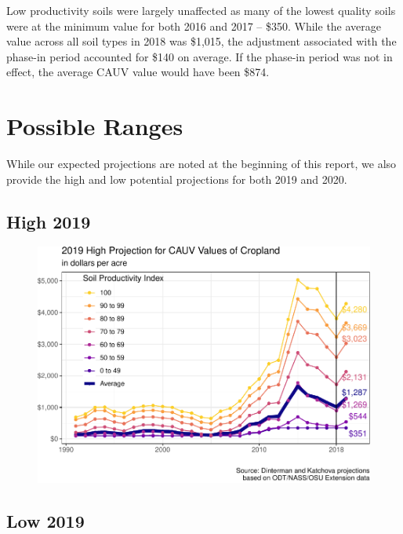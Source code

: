 \documentclass[]{article}
\begin{document}
Low productivity soils were largely unaffected as many of the lowest
quality soils were at the minimum value for both 2016 and 2017 -- \$350.
While the average value across all soil types in 2018 was \$1,015, the
adjustment associated with the phase-in period accounted for \$140 on
average. If the phase-in period was not in effect, the average CAUV
value would have been \$874.

\hypertarget{possible-ranges}{%
\section{Possible Ranges}\label{possible-ranges}}

While our expected projections are noted at the beginning of this
report, we also provide the high and low potential projections for both
2019 and 2020.

\hypertarget{high-2019}{%
\subsection{High 2019}\label{high-2019}}

\begin{figure}[H]
\includegraphics[width=1\linewidth]{4-projections-2019-2020_files/figure-latex/high-trend-1} \caption{\label{fig:high-trend}}\label{fig:high-trend}
\end{figure}

\hypertarget{low-2019}{%
\subsection{Low 2019}\label{low-2019}}
\end{document}
